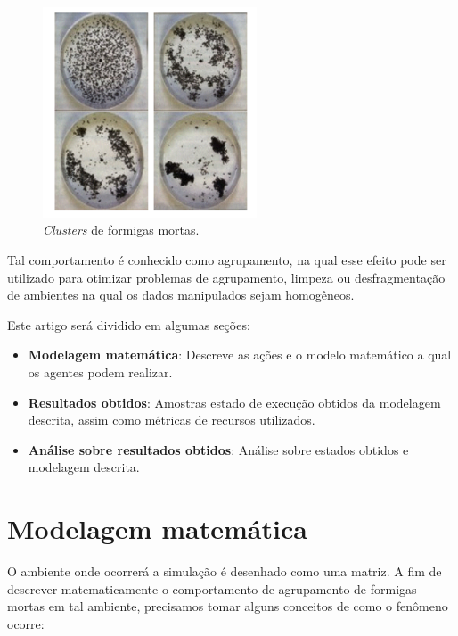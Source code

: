 \documentclass[conference]{IEEEtran}
\begin{document}
\begin{figure}[h]
\centering
\includegraphics[width=2.5in]{clusters.png}
\caption{\textit{Clusters} de formigas mortas.}
\label{fig_sim}
\end{figure}

Tal comportamento é conhecido como agrupamento, na qual esse efeito pode ser utilizado para otimizar problemas de agrupamento, limpeza ou desfragmentação de ambientes na qual os dados manipulados sejam homogêneos.

Este artigo será dividido em algumas seções:

\begin{itemize}
    \item \textbf{Modelagem matemática}: Descreve as ações e o modelo matemático a qual os agentes podem realizar.
    \item \textbf{Resultados obtidos}: Amostras estado de execução obtidos da modelagem descrita, assim como métricas de recursos utilizados.
    \item \textbf{Análise sobre resultados obtidos}: Análise sobre estados obtidos e modelagem descrita.
\end{itemize}

\section{Modelagem matemática}

O ambiente onde ocorrerá a simulação é desenhado como uma matriz. A fim de descrever matematicamente o comportamento de agrupamento de formigas mortas em tal ambiente, precisamos tomar alguns conceitos de como o fenômeno ocorre:
\end{document}
